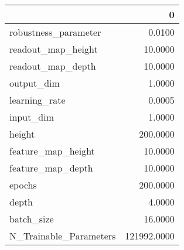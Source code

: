 \begin{tabular}{lr}
\toprule
{} &            0 \\
\midrule
robustness\_parameter   &       0.0100 \\
readout\_map\_height     &      10.0000 \\
readout\_map\_depth      &      10.0000 \\
output\_dim             &       1.0000 \\
learning\_rate          &       0.0005 \\
input\_dim              &       1.0000 \\
height                 &     200.0000 \\
feature\_map\_height     &      10.0000 \\
feature\_map\_depth      &      10.0000 \\
epochs                 &     200.0000 \\
depth                  &       4.0000 \\
batch\_size             &      16.0000 \\
N\_Trainable\_Parameters &  121992.0000 \\
\bottomrule
\end{tabular}
